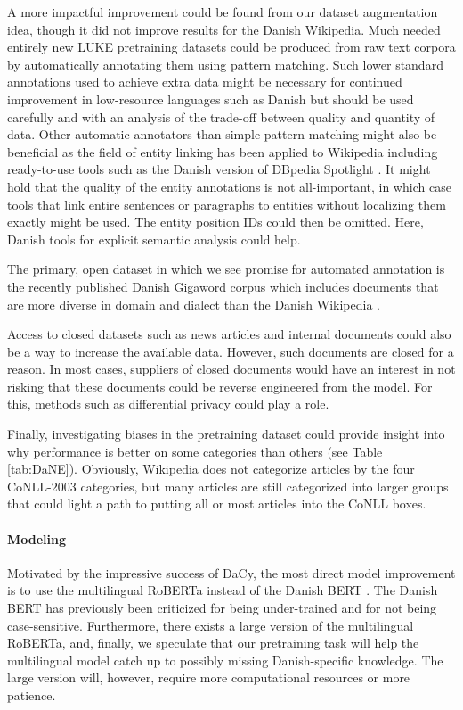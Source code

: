 \documentclass[main.tex]{subfiles}
\begin{document}
A more impactful improvement could be found from our dataset augmentation idea, though it did not improve results for the Danish Wikipedia.
Much needed entirely new LUKE pretraining datasets could be produced from raw text corpora by automatically annotating them using pattern matching.
Such lower standard annotations used to achieve extra data might be necessary for continued improvement in low-resource languages such as Danish but should be used carefully and with an analysis of the trade-off between quality and quantity of data.
Other automatic annotators than simple pattern matching might also be beneficial as the field of entity linking has been applied to Wikipedia \cite{brochier2021wikilink} including ready-to-use tools such as the Danish version of DBpedia Spotlight \cite{isem2013daiber}.
It might hold that the quality of the entity annotations is not all-important, in which case tools that link entire sentences or paragraphs to entities without localizing them exactly might be used.
The entity position IDs could then be omitted.
Here, Danish tools for explicit semantic analysis \cite{hansen2017esa} could help.

The primary, open dataset in which we see promise for automated annotation is the recently published Danish Gigaword corpus which includes documents that are more diverse in domain and dialect than the Danish Wikipedia \cite{derc2021giga}.

Access to closed datasets such as news articles and internal documents could also be a way to increase the available data.
However, such documents are closed for a reason.
In most cases, suppliers of closed documents would have an interest in not risking that these documents could be reverse engineered from the model.
For this, methods such as differential privacy \cite{GONG2020131} could play a role.

Finally, investigating biases in the pretraining dataset could provide insight into why performance is better on some categories than others (see Table \ref{tab:DaNE}).
Obviously, Wikipedia does not categorize articles by the four CoNLL-2003 categories, but many articles are still categorized into larger groups that could light a path to putting all or most articles into the CoNLL boxes.

\paragraph{Modeling}
Motivated by the impressive success of DaCy, the most direct model improvement is to use the multilingual RoBERTa \cite{conneau2020unsupervised} instead of the Danish BERT \cite{botxo2019dabert}.
The Danish BERT has previously been criticized for being under-trained \cite{derc2021giga, nielsen2020textsum} and for not being case-sensitive.
Furthermore, there exists a large version of the multilingual RoBERTa, and, finally, we speculate that our pretraining task will help the multilingual model catch up to possibly missing Danish-specific knowledge.
The large version will, however, require more computational resources or more patience.
\end{document}
